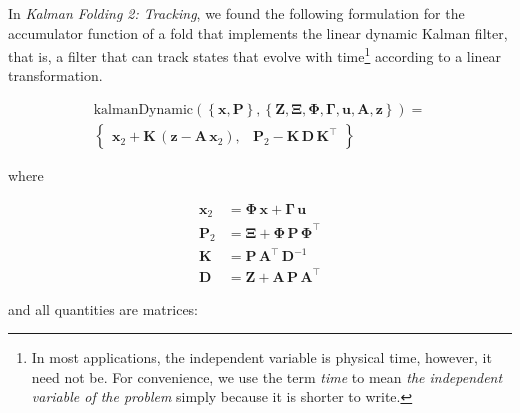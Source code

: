 \documentclass[10pt,oneside,x11names]{article}
\begin{document}
In \emph{Kalman Folding 2: Tracking},\footnotemark[2]{} we found the following
formulation for the accumulator function of a fold that implements the linear
dynamic Kalman filter, that is, a filter that can track states that evolve with
time\footnote{In most applications, the independent variable is physical time,
however, it need not be. For convenience, we use the term \emph{time} to mean \emph{the independent variable of the problem} simply because it is shorter to write.} according to a linear transformation.

\begin{equation}
\label{eqn:kalman-dynamic-cume-definition}
\begin{matrix}
\textrm{kalmanDynamic}
\left(
\left\{
\mathbold{x},
\mathbold{P}
\right\},
\left\{
\mathbold{Z},
\mathbold{\Xi},
\mathbold{\Phi},
\mathbold{\Gamma},
\mathbold{u},
\mathbold{A},
\mathbold{z}
\right\}
\right) = \\
\begin{Bmatrix}
\mathbold{ x }_{ 2 }+
\mathbold{ K }\,
\left(
\mathbold{ z }-
\mathbold{ A }\,
\mathbold{ x }_{ 2 }
\right), &
\mathbold{ P }_{ 2 }-
\mathbold{ K }\,
\mathbold{ D }\,
\mathbold{ K }^\intercal
\end{Bmatrix}
\end{matrix}
\end{equation}

\noindent where

\begin{align}
\label{eqn:state-propagation-equation}
\mathbold{ x }_{ 2 }
&=
\mathbold{ \Phi  }\,
\mathbold{ x }+
\mathbold{ \Gamma  }\,
\mathbold{ u } \\
\label{eqn:covariance-propagation-equation}
\mathbold{ P }_{ 2 }
&=
\mathbold{ \Xi  }+
\mathbold{ \Phi  }\,
\mathbold{ P }\,
\mathbold{ \Phi  }^{ \intercal  } \\
\label{eqn:kalman-gain-definition}
\mathbold{K}
&=
\mathbold{P}\,
\mathbold{A}^\intercal\,
\mathbold{D}^{-1} \\
\label{eqn:kalman-denominator-definition}
\mathbold{D}
&= \mathbold{Z} +
\mathbold{A}\,
\mathbold{P}\,
\mathbold{A}^\intercal
\end{align}

\noindent and all quantities are matrices:
\end{document}
